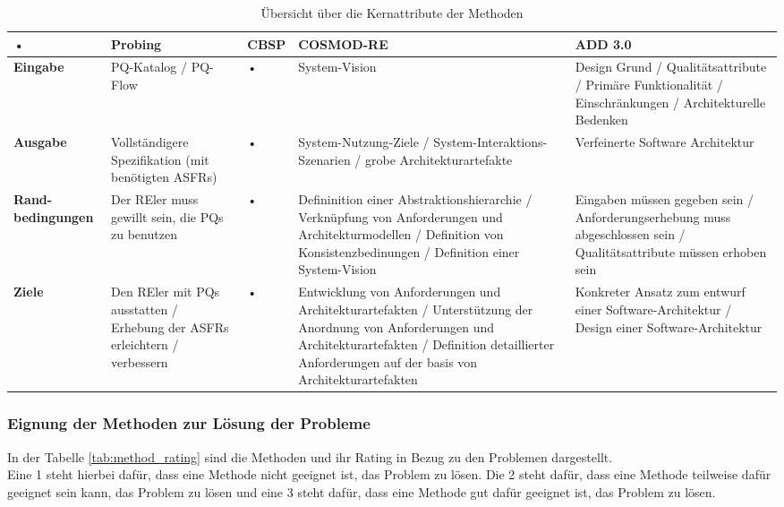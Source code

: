 \begin{table*}[t]
\caption{Übersicht über die Kernattribute der Methoden}
\centering
\begin{tabular}{|p{}|p{}|p{}|p{}|p{}|}%
\hline 
\rule[-1ex]{0pt}{2.5ex} • & \textbf{Probing} &  \textbf{CBSP} & \textbf{COSMOD-RE} & \textbf{ADD 3.0} \\ 
\hline 
\rule[-1ex]{0pt}{2.5ex}  \textbf{Eingabe} &  PQ-Katalog / PQ-Flow & • &  System-Vision & Design Grund / Qualitätsattribute / Primäre Funktionalität / Einschränkungen / Architekturelle Bedenken \\ 
\hline 
\rule[-1ex]{0pt}{2.5ex} \textbf{Ausgabe} & Vollständigere Spezifikation (mit benötigten ASFRs) & • &  System-Nutzung-Ziele / System-Interaktions-Szenarien / grobe Architekturartefakte &  Verfeinerte Software Architektur \\ 
\hline 
\rule[-1ex]{0pt}{2.5ex}  \textbf{Rand-bedingungen} &  Der REler muss gewillt sein, die PQs zu benutzen & • &  Defininition einer Abstraktionshierarchie / Verknüpfung von Anforderungen und Architekturmodellen / Definition von Konsistenzbedinungen / Definition einer System-Vision &  Eingaben müssen gegeben sein / Anforderungserhebung muss abgeschlossen sein / Qualitätsattribute müssen erhoben sein \\ 
\hline 
\rule[-1ex]{0pt}{2.5ex}  \textbf{Ziele} &  Den REler mit PQs ausstatten / Erhebung der ASFRs erleichtern / verbessern & • &  Entwicklung von Anforderungen und Architekturartefakten / Unterstützung der Anordnung von Anforderungen und Architekturartefakten / Definition detaillierter Anforderungen auf der basis von Architekturartefakten &  Konkreter Ansatz zum entwurf einer Software-Architektur / Design einer Software-Architektur \\ 
\hline 
\end{tabular} 
\label{tab:method_intro}
\end{table*}


\subsubsection{Eignung der Methoden zur Lösung der Probleme}
In der Tabelle \ref{tab:method_rating} sind die Methoden und ihr Rating in Bezug zu den Problemen dargestellt.\\

Eine 1 steht hierbei dafür, dass eine Methode nicht geeignet ist, das Problem zu lösen. Die 2 steht dafür, dass eine Methode teilweise dafür geeignet sein kann, das Problem zu lösen und eine 3 steht dafür, dass eine Methode gut dafür geeignet ist, das Problem zu lösen.\\

